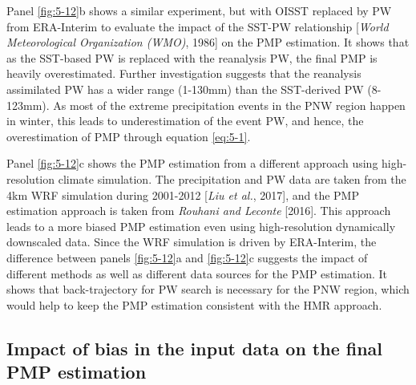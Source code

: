 Panel \ref{fig:5-12}b shows a similar experiment, but with OISST replaced by PW from ERA-Interim to evaluate the impact of the SST-PW relationship [\textit{World Meteorological Organization (WMO)}, 1986] on the PMP estimation. It shows that as the SST-based PW is replaced with the reanalysis PW, the final PMP is heavily overestimated. Further investigation suggests that the reanalysis assimilated PW has a wider range (1-130mm) than the SST-derived PW (8-123mm). As most of the extreme precipitation events in the PNW region happen in winter, this leads to underestimation of the event PW, and hence, the overestimation of PMP through equation \ref{eq:5-1}.

Panel \ref{fig:5-12}c shows the PMP estimation from a different approach using high-resolution climate simulation. The precipitation and PW data are taken from the 4km WRF simulation during 2001-2012 [\textit{Liu et al.}, 2017], and the PMP estimation approach is taken from \textit{Rouhani and Leconte} [2016]. This approach leads to a more biased PMP estimation even using high-resolution dynamically downscaled data. Since the WRF simulation is driven by ERA-Interim, the difference between panels \ref{fig:5-12}a and \ref{fig:5-12}c suggests the impact of different methods as well as different data sources for the PMP estimation. It shows that back-trajectory for PW search is necessary for the PNW region, which would help to keep the PMP estimation consistent with the HMR approach.

\subsection{Impact of bias in the input data on the final PMP estimation}

